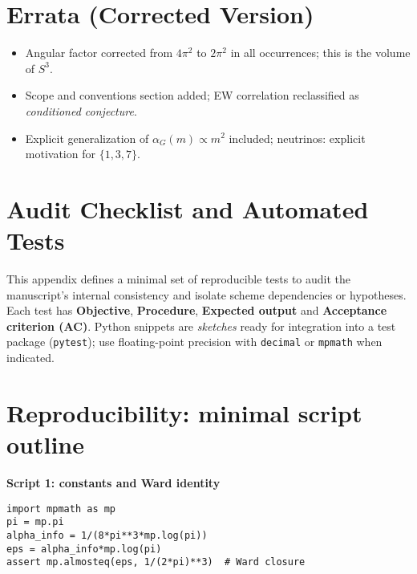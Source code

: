 \documentclass{article}
\numberwithin{equation}{section}
\theoremstyle{plain}
\theoremstyle{definition}
\theoremstyle{remark}
\begin{document}



\section*{Errata (Corrected Version)}
\begin{itemize}
\item Angular factor corrected from $4\pi^2$ to $2\pi^2$ in all occurrences; this is the volume of $S^3$.
\item Scope and conventions section added; EW correlation reclassified as \emph{conditioned conjecture}.
\item Explicit generalization of $\alpha_G(m)\propto m^2$ included; neutrinos: explicit motivation for $\{1,3,7\}$.
\end{itemize}

\section{Audit Checklist and Automated Tests}
\label{app:auditoria}

This appendix defines a minimal set of reproducible tests to audit the manuscript's internal consistency and isolate scheme dependencies or hypotheses. Each test has \textbf{Objective}, \textbf{Procedure}, \textbf{Expected output} and \textbf{Acceptance criterion (AC)}. Python snippets are \emph{sketches} ready for integration into a test package (\texttt{pytest}); use floating-point precision with \texttt{decimal} or \texttt{mpmath} when indicated.


\section{Reproducibility: minimal script outline}
\label{app:reprod}

\noindent
\textbf{Script 1: constants and Ward identity}
\begin{verbatim}
import mpmath as mp
pi = mp.pi
alpha_info = 1/(8*pi**3*mp.log(pi))
eps = alpha_info*mp.log(pi)
assert mp.almosteq(eps, 1/(2*pi)**3)  # Ward closure
\end{verbatim}
\end{document}
